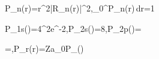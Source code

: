 P_{n\ell}(r)=r^2|R_{n\ell}(r)|^2,\qquad \int_0^\infty P_{n\ell}(r)\,dr=1

P_{1s}(\rho)=4\rho^2e^{-2\rho},\quad P_{2s}(\rho)=8,\quad P_{2p}(\rho)=

\rho=,\qquad P_r(r)=\frac Z{a_0}P_\rho(\rho)
